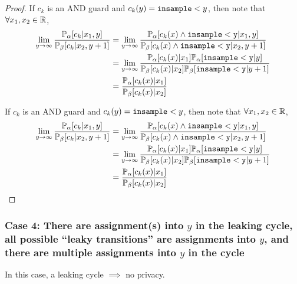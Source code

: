 \begin{proof}
	If $c_k$ is an AND guard and $c_k(y) = \lguard[y]$, then note that $\forall x_1, x_2\in \RR$, \begin{align*}
		\lim_{y\to\infty}\frac{\PP_\alpha[c_k|x_1, y]}{\PP_\beta[c_k|x_2, y+1]}&=\lim_{y\to\infty}\frac{\PP_\alpha[c_k(x)\land \lguard[\texttt{y}]|x_1, y]}{\PP_\beta[c_k(x)\land \lguard[\texttt{y}]|x_2, y+1]}\\
		&=\lim_{y\to\infty}\frac{\PP_\alpha[c_k(x)|x_1]\PP_\alpha[\lguard[\texttt{y}]|y]}{\PP_\beta[c_k(x)|x_2]\PP_\beta[\lguard[\texttt{y}]|y+1]}\\
		&=\frac{\PP_\alpha[c_k(x)|x_1]}{\PP_\beta[c_k(x)|x_2]}
	\end{align*}

	If $c_k$ is an AND guard and $c_k(y) = \lguard[y]$, then note that $\forall x_1, x_2\in \RR$, \begin{align*}
		\lim_{y\to\infty}\frac{\PP_\alpha[c_k|x_1, y]}{\PP_\beta[c_k|x_2, y+1]}&=\lim_{y\to\infty}\frac{\PP_\alpha[c_k(x)\land \lguard[\texttt{y}]|x_1, y]}{\PP_\beta[c_k(x)\land \lguard[\texttt{y}]|x_2, y+1]}\\
		&=\lim_{y\to\infty}\frac{\PP_\alpha[c_k(x)|x_1]\PP_\alpha[\lguard[\texttt{y}]|y]}{\PP_\beta[c_k(x)|x_2]\PP_\beta[\lguard[\texttt{y}]|y+1]}\\
		&=\frac{\PP_\alpha[c_k(x)|x_1]}{\PP_\beta[c_k(x)|x_2]}
	\end{align*}

\end{proof}


\subsubsection{Case 4: There are assignment(s) into $y$ in the leaking cycle, all possible ``leaky transitions'' are assignments into $y$, and there are multiple assignments into $y$ in the cycle}


\begin{thm}
	In this case, a leaking cycle $\implies$ no privacy.
\end{thm}

